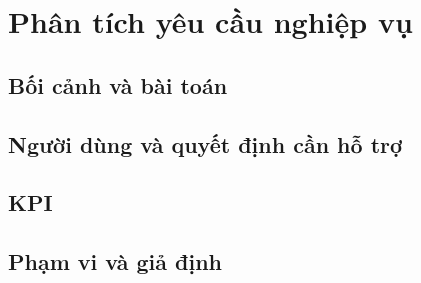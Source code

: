 \chapter{Phân tích yêu cầu nghiệp vụ}
\section{Bối cảnh và bài toán}
\section{Người dùng và quyết định cần hỗ trợ}
\section{KPI}
\section{Phạm vi và giả định}
